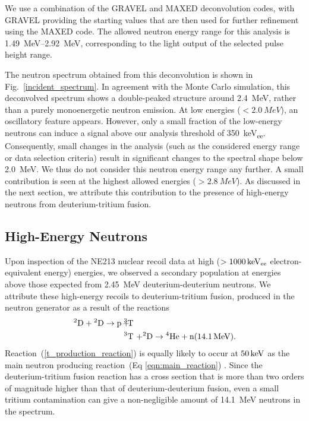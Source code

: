 We use a combination of the GRAVEL \cite{Matzke1994} and MAXED \cite{reginatto2002} deconvolution codes, with GRAVEL providing the starting values that are then used for further refinement using the MAXED code. The allowed neutron energy range for this analysis is \SIrange{1.49}{2.92}{MeV}, corresponding to the light output of the selected pulse height range.

The neutron spectrum obtained from this deconvolution is shown in Fig.~\ref{incident_spectrum}. In agreement with the Monte Carlo simulation, this deconvolved spectrum shows a double-peaked structure around \SI{2.4}{MeV}, rather than a purely monoenergetic neutron emission. At low energies ($<\SI{2.0}{MeV}$), an oscillatory feature appears. However, only a small fraction of the low-energy neutrons can induce a signal above our analysis threshold of \SI{350}{keV_{ee}}. Consequently, small changes in the analysis (such as the considered energy range or data selection criteria) result in significant changes to the spectral shape below \SI{2.0}{MeV}. We thus do not consider this neutron energy range any further. A small contribution is seen at the highest allowed energies ($>\SI{2.8}{MeV}$). As discussed in the next section, we attribute this contribution to the presence of high-energy neutrons from deuterium-tritium fusion.

\subsection{High-Energy Neutrons} \label{he_neutrons}

Upon inspection of the NE213 nuclear recoil data at high ($>1000\, \mathrm{keV_{ee}}$ electron-equivalent energy) energies, we observed a secondary population at energies above those expected from \SI{2.45}{MeV} deuterium-deuterium neutrons. We attribute these high-energy recoils to deuterium-tritium fusion, produced in the neutron generator as a result of the reactions
\begin{eqnarray}
{}^2\mathrm{D} + {}^2\mathrm{D} \rightarrow \mathrm{p}\, + &\!\!\!\!{}^3\mathrm{T}\!\!\!\!& \label{t_production_reaction} \\
                                              &\!\!\!\!^3\mathrm{T}\!\!\!\!& + {}^2\mathrm{D} \rightarrow {}^4\mathrm{He} + \mathrm{n}(14.1\1{MeV}).
\end{eqnarray}
Reaction~(\ref{t_production_reaction}) is equally likely to occur at $50\, \mathrm{keV}$ as the main neutron producing reaction~(Eq \ref{eqn:main_reaction}) \cite{huba2013}. Since the deuterium-tritium fusion reaction has a cross section that is more than two orders of magnitude higher than that of deuterium-deuterium fusion, even a small tritium contamination can give a non-negligible amount of \SI{14.1}{MeV} neutrons in the spectrum.

